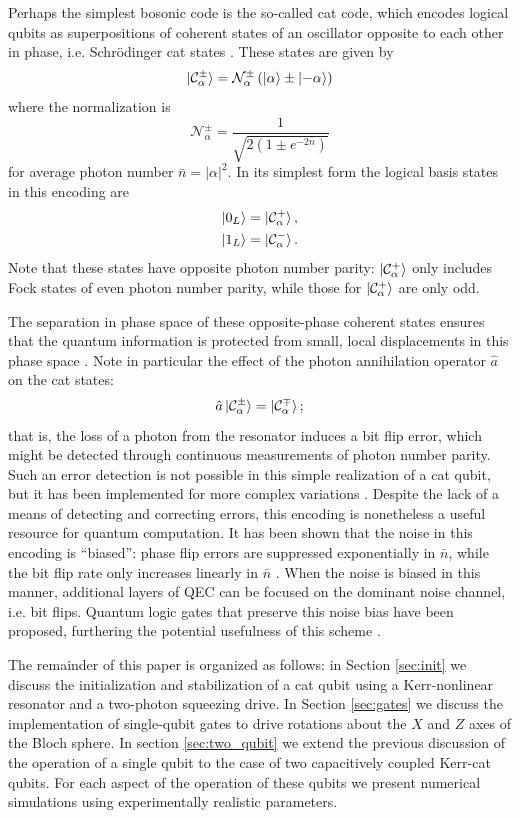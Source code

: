 Perhaps the simplest bosonic code is the so-called cat code, which encodes logical qubits as superpositions of coherent states of an oscillator opposite to each other in phase, i.e. Schr\"odinger cat states \cite{cai_2021,mirrahimi_2014,puri_2017,ofek_2016,grimm_2020,ma_2021}.
These states are given by
\[
    \ket{\mathcal{C}_\alpha^\pm} = \mathcal{N}_\alpha^\pm \left ( \ket{\alpha} \pm \ket{-\alpha} \right )
\]
where the normalization is
\[
    \mathcal{N}_\alpha^\pm = \frac {1} {\sqrt{ 2 \left ( 1 \pm e^{-2\bar{n}} \right ) }}
\]
for average photon number $\bar{n} = |\alpha|^2$.
In its simplest form the logical basis states in this encoding are
\begin{align*}
    \ket{0_L} &= \ket{\mathcal{C}_\alpha^+}, \\
    \ket{1_L} &= \ket{\mathcal{C}_\alpha^-}.
\end{align*}
Note that these states have opposite photon number parity: $\ket{\mathcal{C}_\alpha^+}$ only includes Fock states of even photon number parity, while those for $\ket{\mathcal{C}_\alpha^+}$ are only odd.

The separation in phase space of these opposite-phase coherent states ensures that the quantum information is protected from small, local displacements in this phase space \cite{mirrahimi_2014,grimm_2020}.
Note in particular the effect of the photon annihilation operator $\hat{a}$ on the cat states:
\[
    \hat{a} \ket{\mathcal{C}_\alpha^\pm} = \ket{\mathcal{C}_\alpha^\mp};
\]
that is, the loss of a photon from the resonator induces a bit flip error, which might be detected through continuous measurements of photon number parity.
Such an error detection is not possible in this simple realization of a cat qubit, but it has been implemented for more complex variations \cite{ofek_2016}.
Despite the lack of a means of detecting and correcting errors, this encoding is nonetheless a useful resource for quantum computation.
It has been shown that the noise in this encoding is ``biased'': phase flip errors are suppressed exponentially in $\bar{n}$, while the bit flip rate only increases linearly in $\bar{n}$ \cite{puri_2017,puri_2019}.
When the noise is biased in this manner, additional layers of QEC can be focused on the dominant noise channel, i.e. bit flips.
Quantum logic gates that preserve this noise bias have been proposed, furthering the potential usefulness of this scheme \cite{puri_2020}.

The remainder of this paper is organized as follows: in Section \ref{sec:init} we discuss the initialization and stabilization of a cat qubit using a Kerr-nonlinear resonator and a two-photon squeezing drive.
In Section \ref{sec:gates} we discuss the implementation of single-qubit gates to drive rotations about the $X$ and $Z$ axes of the Bloch sphere.
In section \ref{sec:two_qubit} we extend the previous discussion of the operation of a single qubit to the case of two capacitively coupled Kerr-cat qubits.
For each aspect of the operation of these qubits we present numerical simulations using experimentally realistic parameters.
